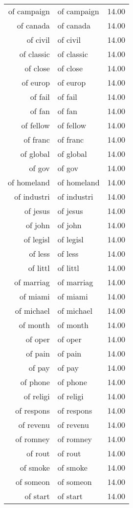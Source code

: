 \begin{table}[ht]
\begin{tabular}{rlr}
  of campaign & of campaign & 14.00 \\ 
  of canada & of canada & 14.00 \\ 
  of civil & of civil & 14.00 \\ 
  of classic & of classic & 14.00 \\ 
  of close & of close & 14.00 \\ 
  of europ & of europ & 14.00 \\ 
  of fail & of fail & 14.00 \\ 
  of fan & of fan & 14.00 \\ 
  of fellow & of fellow & 14.00 \\ 
  of franc & of franc & 14.00 \\ 
  of global & of global & 14.00 \\ 
  of gov & of gov & 14.00 \\ 
  of homeland & of homeland & 14.00 \\ 
  of industri & of industri & 14.00 \\ 
  of jesus & of jesus & 14.00 \\ 
  of john & of john & 14.00 \\ 
  of legisl & of legisl & 14.00 \\ 
  of less & of less & 14.00 \\ 
  of littl & of littl & 14.00 \\ 
  of marriag & of marriag & 14.00 \\ 
  of miami & of miami & 14.00 \\ 
  of michael & of michael & 14.00 \\ 
  of month & of month & 14.00 \\ 
  of oper & of oper & 14.00 \\ 
  of pain & of pain & 14.00 \\ 
  of pay & of pay & 14.00 \\ 
  of phone & of phone & 14.00 \\ 
  of religi & of religi & 14.00 \\ 
  of respons & of respons & 14.00 \\ 
  of revenu & of revenu & 14.00 \\ 
  of romney & of romney & 14.00 \\ 
  of rout & of rout & 14.00 \\ 
  of smoke & of smoke & 14.00 \\ 
  of someon & of someon & 14.00 \\ 
  of start & of start & 14.00 \\ 

\end{tabular}
\end{table}
